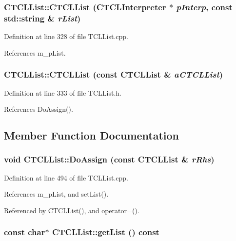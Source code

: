 \subsubsection{\setlength{\rightskip}{0pt plus 5cm}CTCLList::CTCLList ({\bf CTCLInterpreter} $\ast$ {\em p\-Interp}, const std::string \& {\em r\-List})}\label{classCTCLList_a3}




Definition at line 328 of file TCLList.cpp.

References m\_\-p\-List.
\subsubsection{\setlength{\rightskip}{0pt plus 5cm}CTCLList::CTCLList (const CTCLList \& {\em a\-CTCLList})\hspace{0.3cm}{\tt  [inline]}}\label{classCTCLList_a4}




Definition at line 333 of file TCLList.h.

References Do\-Assign().

\subsection{Member Function Documentation}
\subsubsection{\setlength{\rightskip}{0pt plus 5cm}void CTCLList::Do\-Assign (const CTCLList \& {\em r\-Rhs})\hspace{0.3cm}{\tt  [protected]}}\label{classCTCLList_b1}




Definition at line 494 of file TCLList.cpp.

References m\_\-p\-List, and set\-List().

Referenced by CTCLList(), and operator=().
\subsubsection{\setlength{\rightskip}{0pt plus 5cm}const char$\ast$ CTCLList::get\-List () const\hspace{0.3cm}{\tt  [inline]}}\label{classCTCLList_a8}




